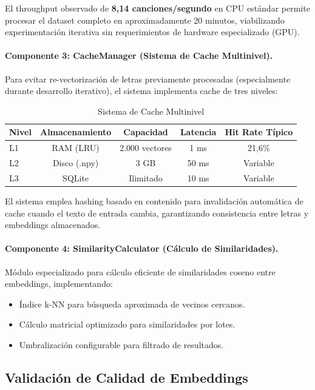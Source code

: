 El throughput observado de \textbf{8,14 canciones/segundo} en CPU estándar permite procesar el dataset completo en aproximadamente 20 minutos, viabilizando experimentación iterativa sin requerimientos de hardware especializado (GPU).

\paragraph{Componente 3: CacheManager (Sistema de Cache Multinivel).}
Para evitar re-vectorización de letras previamente procesadas (especialmente durante desarrollo iterativo), el sistema implementa cache de tres niveles:

\begin{table}[htbp]
\centering
\caption{Sistema de Cache Multinivel}
\label{tab:cache-multinivel}
\begin{tabular}{lcccc}
\toprule
\textbf{Nivel} & \textbf{Almacenamiento} & \textbf{Capacidad} & \textbf{Latencia} & \textbf{Hit Rate Típico} \\
\midrule
L1 & RAM (LRU) & 2.000 vectores & 1 ms & 21,6\% \\
L2 & Disco (.npy) & 3 GB & 50 ms & Variable \\
L3 & SQLite & Ilimitado & 10 ms & Variable \\
\bottomrule
\end{tabular}
\end{table}

El sistema emplea hashing basado en contenido para invalidación automática de cache cuando el texto de entrada cambia, garantizando consistencia entre letras y embeddings almacenados.

\paragraph{Componente 4: SimilarityCalculator (Cálculo de Similaridades).}
Módulo especializado para cálculo eficiente de similaridades coseno entre embeddings, implementando:
\begin{itemize}
    \item Índice k-NN para búsqueda aproximada de vecinos cercanos.
    \item Cálculo matricial optimizado para similaridades por lotes.
    \item Umbralización configurable para filtrado de resultados.
\end{itemize}

\subsection{Validación de Calidad de Embeddings}
\label{subsec:validacion-embeddings}

